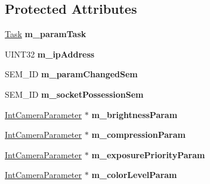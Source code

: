 \subsection*{Protected Attributes}
\begin{DoxyCompactItemize}
\item 
\hypertarget{classAxisCameraParams_a1602f53258b24bf7d52d8c020e969ea6}{
\hyperlink{classTask}{Task} {\bfseries m\_\-paramTask}}
\label{classAxisCameraParams_a1602f53258b24bf7d52d8c020e969ea6}

\item 
\hypertarget{classAxisCameraParams_a13ab99635565e3a983d874dd613179b5}{
UINT32 {\bfseries m\_\-ipAddress}}
\label{classAxisCameraParams_a13ab99635565e3a983d874dd613179b5}

\item 
\hypertarget{classAxisCameraParams_a2d4865d824f0b862f8dedb0b656d5a2f}{
SEM\_\-ID {\bfseries m\_\-paramChangedSem}}
\label{classAxisCameraParams_a2d4865d824f0b862f8dedb0b656d5a2f}

\item 
\hypertarget{classAxisCameraParams_ad702e34a959e3fc73d489b7d76c15479}{
SEM\_\-ID {\bfseries m\_\-socketPossessionSem}}
\label{classAxisCameraParams_ad702e34a959e3fc73d489b7d76c15479}

\item 
\hypertarget{classAxisCameraParams_a10c8e47483d4243ccadb7600608a6ee9}{
\hyperlink{classIntCameraParameter}{IntCameraParameter} $\ast$ {\bfseries m\_\-brightnessParam}}
\label{classAxisCameraParams_a10c8e47483d4243ccadb7600608a6ee9}

\item 
\hypertarget{classAxisCameraParams_a4b7d3810a215d68f66c65c64d35e1e0d}{
\hyperlink{classIntCameraParameter}{IntCameraParameter} $\ast$ {\bfseries m\_\-compressionParam}}
\label{classAxisCameraParams_a4b7d3810a215d68f66c65c64d35e1e0d}

\item 
\hypertarget{classAxisCameraParams_a85006a629bed719321252b800e1748fd}{
\hyperlink{classIntCameraParameter}{IntCameraParameter} $\ast$ {\bfseries m\_\-exposurePriorityParam}}
\label{classAxisCameraParams_a85006a629bed719321252b800e1748fd}

\item 
\hypertarget{classAxisCameraParams_ae7a40a153ca161aa95193105cdaebc57}{
\hyperlink{classIntCameraParameter}{IntCameraParameter} $\ast$ {\bfseries m\_\-colorLevelParam}}
\label{classAxisCameraParams_ae7a40a153ca161aa95193105cdaebc57}


\end{DoxyCompactItemize}
